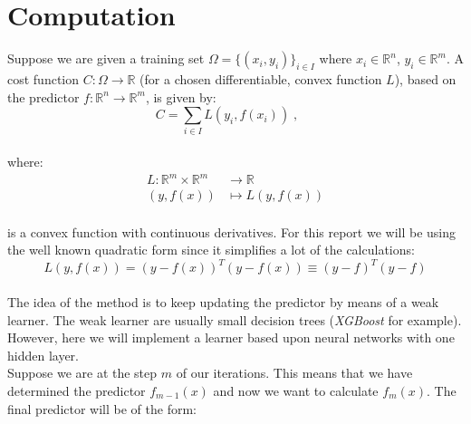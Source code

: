 \section*{Computation}

Suppose we are given a training set $\Omega = \{(x_i, y_i)\}_{i\in I}$ where $x_i\in\mathbb{R}^n$, $y_i\in\mathbb{R}^m$. A cost function $C: \Omega\rightarrow\mathbb{R}$ (for a chosen differentiable, convex function $L$), based on the predictor $f:\mathbb{R}^n\rightarrow\mathbb{R}^m$, is given by:\\

\begin{equation}
C = \sum_{i\in I} L(y_i, f(x_i))\;,\quad\;
\end{equation}\\

\noindent where:\\

\begin{equation*}
\begin{aligned}
L:\mathbb{R}^m\times\mathbb{R}^m&\rightarrow\mathbb{R}\\
(y, f(x))&\mapsto L(y, f(x))
\end{aligned}
\end{equation*}\\

\noindent is a convex function with continuous derivatives. For this report we will be using the well known quadratic form since it simplifies a lot of the calculations:\\

\begin{equation*}
L(y, f(x))=(y-f(x))^T(y-f(x))\equiv(y-f)^T(y-f)
\end{equation*}\\

The idea of the method is to keep updating the predictor by means of a weak learner. The weak learner are usually small decision trees (\emph{XGBoost} for example). However, here we will implement a learner based upon neural networks with one hidden layer.\\

Suppose we are at the step $m$ of our iterations. This means that we have determined the predictor $f_{m-1}(x)$ and now we want to calculate $f_{m}(x)$. The final predictor will be of the form:\\

